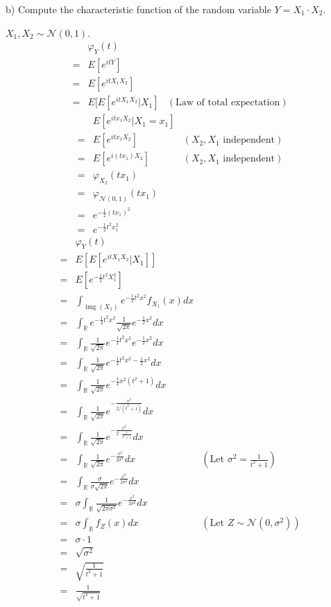 \documentclass{article}
\begin{document}
\begin{ssubproblem}
b) Compute the characteristic function of the random variable \(Y = X_1\cdot X_2\).
\end{ssubproblem}

\begin{ssolution}
\(X_1,X_2 \sim \mathcal{N}(0,1)\).
\begin{align*}
	& \varphi_Y(t) \\
	=& E[e^{it Y}] \\
	=& E[e^{it X_1 X_2}] \\
	=& E[E[e^{it X_1 X_2}|X_1] & (\text{Law of total expectation})
\end{align*}
\begin{align*}
	& E[e^{it x_1 X_2}|X_1=x_1] \\
	=& E[e^{it x_1 X_2}] & (X_2,X_1\text{ independent}) \\
	=& E[e^{i (t x_1) X_2}] & (X_2,X_1\text{ independent}) \\
	=& \varphi_{X_2}(t x_1) \\
	=& \varphi_{\mathcal{N}(0,1)}(t x_1) \\
	=& e^{-\frac{1}{2}(t x_1)^2} \\
	=& e^{-\frac{1}{2}t^2 x_1^2}
\end{align*}
\begin{align*}
	& \varphi_Y(t) \\
	=& E[E[e^{it X_1 X_2}|X_1]] \\
	=& E[e^{-\frac{1}{2}t^2 X_1^2}] \\
	=& \int_{\operatorname{img}(X_1)} e^{-\frac12 t^2 x^2} f_{X_1}(x) dx \\
	=& \int_{\mathbb{R}} e^{-\frac12 t^2 x^2} \frac{1}{\sqrt{2\pi}} e^{-\frac12 x^2} dx \\
	=& \int_{\mathbb{R}} \frac{1}{\sqrt{2\pi}} e^{-\frac12 t^2 x^2}  e^{-\frac12 x^2} dx \\
	=& \int_{\mathbb{R}} \frac{1}{\sqrt{2\pi}} e^{-\frac12 t^2 x^2-\frac12 x^2} dx \\
	=& \int_{\mathbb{R}} \frac{1}{\sqrt{2\pi}} e^{-\frac12 x^2 (t^2 + 1)} dx \\
	=& \int_{\mathbb{R}} \frac{1}{\sqrt{2\pi}} e^{-\frac{x^2}{2/(t^2 + 1)}} dx \\
	=& \int_{\mathbb{R}} \frac{1}{\sqrt{2\pi}} e^{-\frac{x^2}{2\cdot \frac{1}{t^2 + 1}}} dx \\
	=& \int_{\mathbb{R}} \frac{1}{\sqrt{2\pi}} e^{-\frac{x^2}{2 \sigma^2}} dx & (\text{Let }\sigma^2=\frac{1}{t^2+1}) \\
	=& \int_{\mathbb{R}} \frac{\sigma}{\sigma \sqrt{2\pi}} e^{-\frac{x^2}{2 \sigma^2}} dx \\
	=& \sigma \int_{\mathbb{R}} \frac{1}{\sqrt{2\pi \sigma^2}} e^{-\frac{x^2}{2 \sigma^2}} dx \\
	=& \sigma \int_{\mathbb{R}} f_Z(x)dx & (\text{Let }Z\sim \mathcal{N}(0,\sigma^2)) \\
	=& \sigma \cdot 1 \\
	=& \sqrt{\sigma^2} \\
	=& \sqrt{\frac{1}{t^2+1}} \\
	=& \frac{1}{\sqrt{t^2+1}}
\end{align*}
\end{ssolution}
\end{document}
